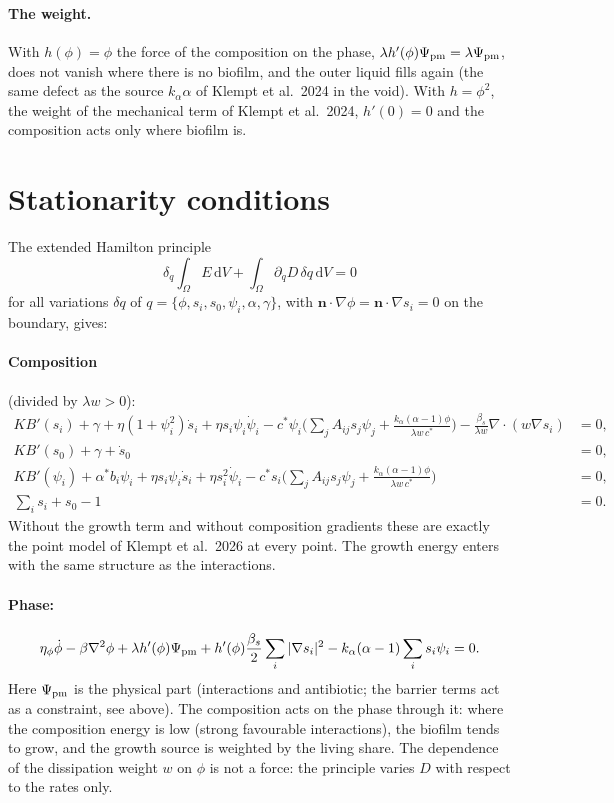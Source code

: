 \documentclass[11pt,a4paper]{article}
\newcommand{\dd}{\,\mathrm{d}}
\begin{document}
\paragraph{The weight.} With $h(\phi)=\phi$ the force of the composition on the phase,
$\lambda h'(\phi)\Psi_{\rm pm}=\lambda\Psi_{\rm pm}$, does not vanish where there is no
biofilm, and the outer liquid fills again (the same defect as the source $k_\alpha\alpha$ of
Klempt et al.\ 2024 in the void). With $h=\phi^2$, the weight of the mechanical term of
Klempt et al.\ 2024, $h'(0)=0$ and the composition acts only where biofilm is.

\section{Stationarity conditions}

The extended Hamilton principle
\[\delta_q\int_\Omega E\dd V+\int_\Omega\partial_{\dot q}D\,\delta q\dd V=0\]
for all variations $\delta q$ of $q=\{\phi,s_i,s_0,\psi_i,\alpha,\gamma\}$, with
$\mathbf n\cdot\nabla\phi=\mathbf n\cdot\nabla s_i=0$ on the boundary, gives:

\paragraph{Composition} (divided by $\lambda w>0$):
\begin{align}
K B'(s_i)+\gamma+\eta(1+\psi_i^2)\dot s_i+\eta s_i\psi_i\dot\psi_i
-c^*\psi_i\Big(\sum_jA_{ij}s_j\psi_j+\frac{k_\alpha(\alpha-1)\phi}{\lambda w\,c^*}\Big)
-\frac{\beta_s}{\lambda w}\nabla\!\cdot(w\nabla s_i)&=0,\\
K B'(s_0)+\gamma+\dot s_0&=0,\\
K B'(\psi_i)+\alpha^*b_i\psi_i+\eta s_i\psi_i\dot s_i+\eta s_i^2\dot\psi_i
-c^*s_i\Big(\sum_jA_{ij}s_j\psi_j+\frac{k_\alpha(\alpha-1)\phi}{\lambda w\,c^*}\Big)&=0,\\
\textstyle\sum_is_i+s_0-1&=0.
\end{align}
Without the growth term and without composition gradients these are exactly the point
model of Klempt et al.\ 2026 at every point. The growth energy enters with the same
structure as the interactions.

\paragraph{Phase:}
\begin{equation}
\eta_\phi\dot\phi-\beta\nabla^2\phi+\lambda h'(\phi)\Psi_{\rm pm}+h'(\phi)\frac{\beta_s}{2}\sum_i|\nabla s_i|^2
-k_\alpha(\alpha-1)\sum_is_i\psi_i=0 .
\end{equation}
Here $\Psi_{\rm pm}$ is the physical part (interactions and antibiotic; the barrier terms
act as a constraint, see above). The composition acts on the phase through it: where the composition
energy is low (strong favourable interactions), the biofilm tends to grow, and the growth
source is weighted by the living share. The dependence of the dissipation weight $w$ on
$\phi$ is not a force: the principle varies $D$ with respect to the rates only.
\end{document}
